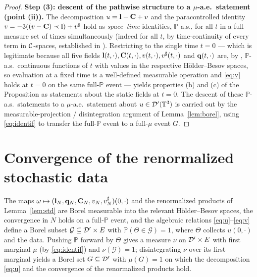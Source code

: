\begin{proof}
\medskip
\textbf{Step (3): descent of the pathwise structure to a $\mu$-a.e.\ statement
(point (ii)).}
The decomposition $u=\mathbf{l}-\mathbf{C}+v$ and the paracontrolled identity
$v=-3((v-\mathbf{C})\prec\mathbf{l})+v^\sharp$ hold as \emph{space--time} identities,
$\mathbb P$-a.s., for all $t$ in a full-measure set of times simultaneously (indeed
for all $t$, by time-continuity of every term in $\mathcal{C}$-spaces, established in
\cite{EW24}). Restricting to the single time $t=0$ --- which is legitimate because
all five fields $\mathbf{l}(t,\cdot),\mathbf{C}(t,\cdot),v(t,\cdot),v^\sharp(t,\cdot)$ and
$\mathbf{q}(t,\cdot)$ are, by \cite{HKN24,EW24}, $\mathbb P$-a.s.\ continuous functions
of $t$ with values in the respective H\"older--Besov spaces, so evaluation at a
fixed time is a well-defined measurable operation and \eqref{eq:v} holds at $t=0$
on the same full-$\mathbb P$ event --- yields properties (b) and (c) of the
Proposition as statements about the static fields at $t=0$. The descent of these
$\mathbb P$-a.s.\ statements to a $\mu$-a.e.\ statement about $u\in\mathcal{D}'(\mathbb{T}^3)$ is
carried out by the measurable-projection / disintegration argument of
Lemma~\ref{lem:borel}, using \eqref{eq:identif} to transfer the full-$\mathbb P$
event to a full-$\mu$ event $G$.
\end{proof}

\section*{Convergence of the renormalized stochastic data}

\begin{qonelemma}\label{lem:borel}
The maps $\omega\mapsto(\mathbf{l}_N,\mathbf{q}_N,\mathbf{C}_N,v_N,v_N^\sharp)(0,\cdot)$ and the
renormalized products of Lemma~\ref{lem:std} are Borel measurable into the relevant
H\"older--Besov spaces, the convergence in $N$ holds on a full-$\mathbb P$ event, and
the algebraic relations \eqref{eq:u}--\eqref{eq:v} define a Borel subset
$\mathcal G\subseteq\mathcal{D}'\times E$ with $\mathbb P(\Theta\in\mathcal G)=1$, where
$\Theta$ collects $u(0,\cdot)$ and the data. Pushing $\mathbb P$ forward by $\Theta$
gives a measure $\nu$ on $\mathcal{D}'\times E$ with first marginal $\mu$ (by
\eqref{eq:identif}) and $\nu(\mathcal G)=1$; disintegrating $\nu$ over its first
marginal yields a Borel set $G\subseteq\mathcal{D}'$ with $\mu(G)=1$ on which the
decomposition \eqref{eq:u} and the convergence of the renormalized products hold.
\end{qonelemma}

